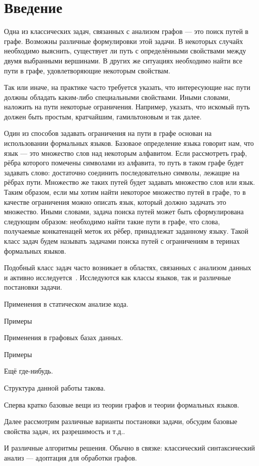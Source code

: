 \section{Введение}


Одна из классических задач, связанных с анализом графов --- это поиск путей в графе.
Возможны различные формулировки этой задачи.
В некоторых случайх необходимо выяснить, существует ли путь с определёнными свойствами между двумя выбранными вершинами.
В других же ситуациях необходимо найти все пути в графе, удовлетворяющие некоторым свойствам.

Так или иначе, на практике часто требуется указать, что интересующие нас пути должны обладать каким-либо специальными свойствами.
Иными словами, наложить на пути некоторые ограничения.
Например, указать, что искомый путь должен быть простым, кратчайшим, гамильтоновым и так далее.

Один из способов задавать ограничения на пути в графе основан на использовании формальных языков.
Базоваое определение языка говорит нам, что язык --- это множество слов над некоторым алфавитом.
Если рассмотреть граф, рёбра которого помечены символами из алфавита, то путь в таком графе будет задавать слово: достаточно соединить последовательно символы, лежащие на рёбрах пути.
Множество же таких путей будет задавать множество слов или язык.
Таким образом, если мы хотим найти некоторое множество путей в графе, то в качестве ограничения можно описать язык, который должно задачать это множество.
Иными словами, задача поиска путей может быть сформулирована следующим образом: необходимо найти такие пути в графе, что слова, получаемые конкатенацей меток их рёбер, принадлежат заданному языку.
Такой класс задач будем называть задачами поиска путей с ограничениям в теринах формальных языков.

Подобный класс задач часто возникает в областях, связанных с анализом данных и активно исследуется~\cite{doi:10.1137/S0097539798337716,axelsson2011formal,10.1007/978-3-642-22321-1_24,Ward:2010:CRL:1710158.1710234,barrett2007label,doi:10.1137/S0097539798337716}.
Исследуются как классы языков, так и различные постановки задачи.

Применения в статическом анализе кода.
\begin{example}
Примеры
\end{example}

Применения в графовых базах данных.
\begin{example}
Примеры
\end{example}

Ещё где-нибудь.

Структура данной работы такова.

Сперва кратко базовые вещи из теории графов и теории формальных языков.

Далее рассмотрим различные варианты постановки задачи, обсудим базовые свойства задач, их разрешимость и т.д..

И различные алгоритмы решения.
Обычно в связке: классический синтаксический анализ --- адоптация для обработки графов.


